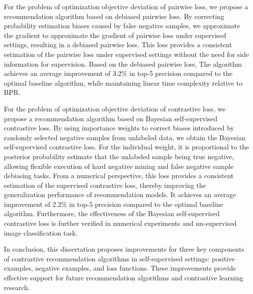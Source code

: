 {For the problem of optimization objective deviation of pairwise loss, we propose a recommendation algorithm based on debiased pairwise loss. By correcting probability estimation biases caused by false negative samples, we approximate the gradient to approximate the gradient of pairwise loss under supervised settings, resulting in a debiased pairwise loss. This loss provides a consistent estimation of the pairwise loss under supervised settings without the need for side information for supervision. Based on the debiased pairwise loss, The algorithm achieves an average improvement of 3.2\% in top-5 precision compared to the optimal baseline algorithm, while maintaining linear time complexity relative to BPR.
	
For the problem of optimization objective deviation of contrastive loss, we propose a recommendation algorithm based on Bayesian self-supervised contrastive loss. By using importance weights to correct biases introduced by randomly selected negative samples from unlabeled data, we obtain the Bayesian self-supervised contrastive loss. For the individual weight, it is proportional to the posterior probability estimate that the unlabeled sample being true negative, allowing flexible execution of hard negative mining and false negative sample debiasing tasks. From a numerical perspective, this loss provides a consistent estimation of the supervised contrastive loss, thereby improving the generalization performance of recommendation models. It achieves an average improvement of 2.2\% in top-5 precision compared to the optimal baseline algorithm. Furthermore, the effectiveness of the Bayesian self-supervised contrastive loss is further verified in numerical experiments and  un-supervised image classification task.
	
In conclusion, this dissertation proposes improvements for three key components of contrastive recommendation algorithms in self-supervised settings: positive examples, negative examples, and loss functions. These improvements provide effective support for future recommendation algorithms and contrastive learning research. }

